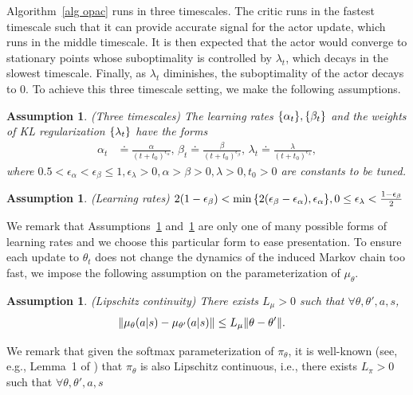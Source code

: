 \documentclass[twoside,11pt]{article}
\newcounter{assucounter}
\numberwithin{assucounter}{section}
\newtheorem{assumption}[assucounter]{Assumption}
\begin{document}
Algorithm~\ref{alg opac} runs in three timescales.
The critic runs in the fastest timescale such that it can provide accurate signal for the actor update,
which runs in the middle timescale.
It is then expected that the actor would converge to stationary points whose suboptimality is controlled by $\lambda_t$,
which decays in the slowest timescale.
Finally,
as $\lambda_t$ diminishes,
the suboptimality of the actor decays to 0.
To achieve this three timescale setting,
we make the following assumptions.
\begin{assumption}
  \label{assu three timescales}
  (Three timescales)
  The learning rates $\qty{\alpha_t}, \qty{\beta_t}$ 
  and the weights of KL regularization $\qty{\lambda_t}$
  have the forms
  \begin{align}
    \alpha_t &\doteq \frac{\alpha}{(t+t_0)^{\epsilon_\alpha}}, \,
    \beta_t \doteq \frac{\beta}{(t+t_0)^{\epsilon_\beta}}, \,
    \lambda_t \doteq \frac{\lambda}{(t+t_0)^{\epsilon_\lambda}},
  \end{align} 
  where $0.5 < \epsilon_\alpha < \epsilon_\beta \leq 1, \epsilon_\lambda >0, \alpha > \beta > 0, \lambda > 0, t_0 > 0$ are constants to be tuned. 
\end{assumption}
\begin{assumption}
  \label{assu lr decay speed}
  (Learning rates)
  $2(1-\epsilon_\beta) < \min\qty{2(\epsilon_\beta - \epsilon_\alpha), \epsilon_\alpha}, 0 \leq \epsilon_\lambda < \frac{1 - \epsilon_\beta}{2}$
\end{assumption}
We remark that Assumptions~\ref{assu three timescales} and~\ref{assu lr decay speed} are only one of many possible forms of learning rates 
and we choose this particular form to ease presentation.
To ensure each update to $\theta_t$ does not change the dynamics of the induced Markov chain too fast,
we impose the following assumption on the parameterization of $\mu_\theta$.
\begin{assumption}
  \label{assu lipschitz mu}
  (Lipschitz continuity) There exists $L_\mu > 0$ such that $\forall \theta, \theta', a, s$,
  \begin{align}
    \norm{\mu_\theta(a|s) - \mu_{\theta'}(a|s)} &\leq L_\mu \norm{\theta - \theta'}.
  \end{align}
\end{assumption}
We remark that given the softmax parameterization of $\pi_\theta$,
it is well-known (see, e.g., Lemma~1 of \citealt{wang2020finite}) that $\pi_\theta$ is also Lipschitz continuous,
i.e.,
there exists $L_\pi > 0$ such that $\forall \theta, \theta', a, s$
\end{document}
